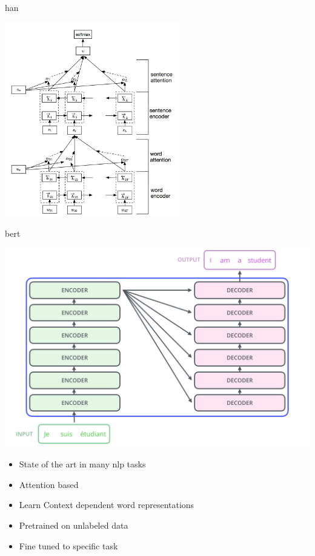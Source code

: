 \begin{frame}{\ac{han}}
  \begin{center}
    \includegraphics[width=0.57\textwidth]{img/han.png}
  \end{center}    
\end{frame}

\begin{frame}{\acf{bert}}
  \begin{center}
      \includegraphics[width=.5\textwidth]{img/transformer1.png}
      
  \end{center}
  \begin{itemize}
  \item State of the art in many \acs{nlp} tasks
  \item \alert{Attention} based
  \item Learn \alert{Context dependent} word representations
  \item \alert{Pretrained} on unlabeled data
  \item \alert{Fine tuned} to specific task
  \end{itemize}
\end{frame}


